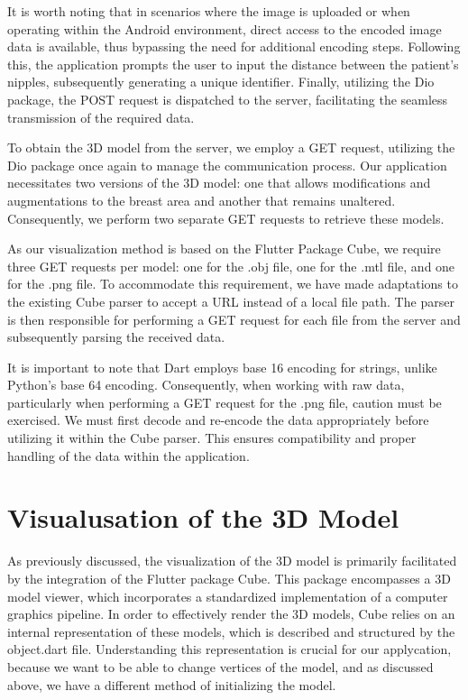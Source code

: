 It is worth noting that in scenarios where the image is uploaded or when operating within the Android environment, 
direct access to the encoded image data is available, thus bypassing the need for additional encoding steps. Following this, 
the application prompts the user to input the distance between the patient's nipples, subsequently generating a unique identifier. Finally, 
utilizing the Dio package, the POST request is dispatched to the server, facilitating the seamless transmission of the required data.

To obtain the 3D model from the server, we employ a GET request, utilizing the Dio package once again to manage the communication process. 
Our application necessitates two versions of the 3D model: one that allows modifications and augmentations to the breast area and another 
that remains unaltered. Consequently, we perform two separate GET requests to retrieve these models.

As our visualization method is based on the Flutter Package Cube, we require three GET requests per model: one for the .obj file, one for 
the .mtl file, and one for the .png file. To accommodate this requirement, we have made adaptations to the existing Cube parser to accept 
a URL instead of a local file path. The parser is then responsible for performing a GET request for each file from the server and subsequently parsing the received data.

It is important to note that Dart employs base 16 encoding for strings, unlike Python's base 64 encoding. Consequently, when working with raw data, 
particularly when performing a GET request for the .png file, caution must be exercised. We must first decode and re-encode the data appropriately 
before utilizing it within the Cube parser. This ensures compatibility and proper handling of the data within the application.

\section{Visualusation of the 3D Model}

As previously discussed, the visualization of the 3D model is primarily facilitated by the integration of the Flutter package Cube. 
This package encompasses a 3D model viewer, which incorporates a standardized implementation of a computer graphics pipeline. 
In order to effectively render the 3D models, Cube relies on an internal representation of these models, which is described and structured by the object.dart file.
Understanding this representation is crucial for our applycation, because we want to be able to change vertices of the model, and as discussed above,
we have a different method of initializing the model. 

